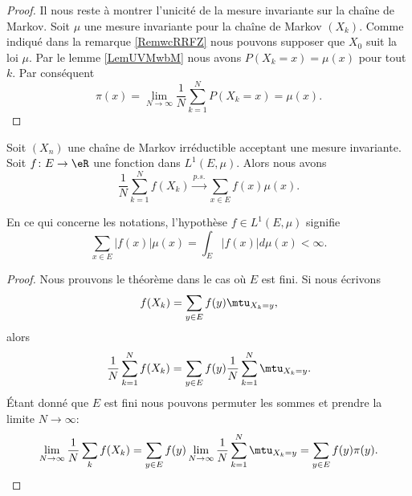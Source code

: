 \begin{proof}
    Il nous reste à montrer l'unicité de la mesure invariante sur la chaîne de Markov. Soit \( \mu\) une mesure invariante pour la chaîne de Markov $(X_k)$. Comme indiqué dans la remarque \ref{RemwcRRFZ} nous pouvons supposer que $X_0$ suit la loi \( \mu\). Par le lemme \ref{LemUVMwbM} nous avons \( P(X_k=x)=\mu(x)\) pour tout \( k\). Par conséquent
    \begin{equation}
        \pi(x)=\lim_{N\to \infty} \frac{1}{ N }\sum_{k=1}^NP(X_k=x)=\mu(x).
    \end{equation}
\end{proof}

\begin{theorem}
    Soit \( (X_n)\) une chaîne de Markov irréductible acceptant une mesure invariante. Soit \( f\colon E\to \eR\) une fonction dans \( L^1(E,\mu)\). Alors nous avons
    \begin{equation}
        \frac{1}{ N }\sum_{k=1}^Nf(X_k)\stackrel{p.s.}{\longrightarrow}\sum_{x\in E}f(x)\mu(x).
    \end{equation}
\end{theorem}
En ce qui concerne les notations, l'hypothèse \( f\in L^1(E,\mu)\) signifie
\begin{equation}
    \sum_{x\in E}| f(x) |\mu(x)=\int_E| f(x) |d\mu(x)<\infty.
\end{equation}

\begin{proof}
    Nous prouvons le théorème dans le cas où \( E\) est fini. Si nous écrivons
    \begin{equation}
        f(X_k)=\sum_{y\in E}f(y)\mtu_{X_k=y},
    \end{equation}
    alors
    \begin{equation}
        \frac{1}{ N }\sum_{k=1}^Nf(X_k)=\sum_{y\in E}f(y)\frac{1}{ N }\sum_{k=1}^N\mtu_{X_k=y}.
    \end{equation}
    Étant donné que \( E\) est fini nous pouvons permuter les sommes et prendre la limite \( N\to\infty\):
    \begin{equation}
        \lim_{N\to \infty} \frac{1}{ N }\sum_kf(X_k)=\sum_{y\in E}f(y)\lim_{N\to \infty} \frac{1}{ N }\sum_{k=1}^N\mtu_{X_k=y}=\sum_{y\in E}f(y)\pi(y).
    \end{equation}
\end{proof}

